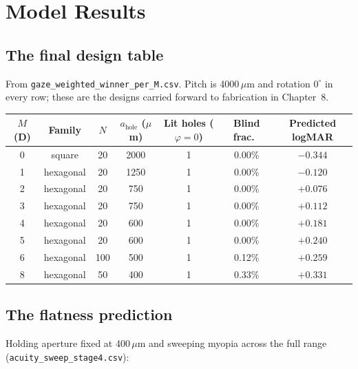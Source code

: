 \documentclass[11pt]{report}
\begin{document}
\chapter{Model Results}

\section{The final design table}

From \texttt{gaze\_weighted\_winner\_per\_M.csv}. Pitch is 4000\,$\mu$m and rotation
$0^\circ$ in every row; these are the designs carried forward to fabrication in Chapter~8.

\begin{center}
\begin{tabular}{ccccccc}
\toprule
$M$ (D) & Family & $N$ & $a_{\text{hole}}$ ($\mu$m) & Lit holes ($\varphi{=}0$) & Blind
frac.\ & Predicted logMAR \\
\midrule
0 & square & 20 & 2000 & 1 & 0.00\% & $-0.344$ \\
1 & hexagonal & 20 & 1250 & 1 & 0.00\% & $-0.120$ \\
2 & hexagonal & 20 & 750 & 1 & 0.00\% & $+0.076$ \\
3 & hexagonal & 20 & 750 & 1 & 0.00\% & $+0.112$ \\
4 & hexagonal & 20 & 600 & 1 & 0.00\% & $+0.181$ \\
5 & hexagonal & 20 & 600 & 1 & 0.00\% & $+0.240$ \\
6 & hexagonal & 100 & 500 & 1 & 0.12\% & $+0.259$ \\
8 & hexagonal & 50 & 400 & 1 & 0.33\% & $+0.331$ \\
\bottomrule
\end{tabular}
\end{center}

\section{The flatness prediction}

Holding aperture fixed at 400\,$\mu$m and sweeping myopia across the full range
(\texttt{acuity\_sweep\_stage4.csv}):
\end{document}
